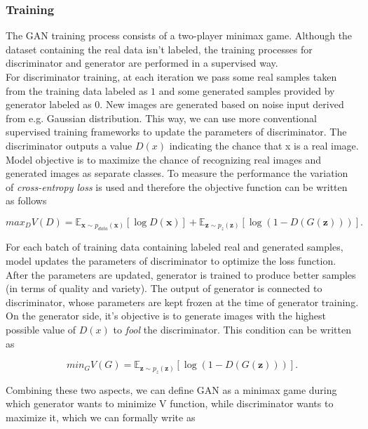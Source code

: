 \documentclass[12pt,a4paper,openany]{book}
\begin{document}
\subsubsection{Training}
\noindent The GAN training process consists of a two-player minimax game. Although the dataset containing the real data isn’t labeled, the training processes for discriminator and generator are performed in a supervised way.  \\
\noindent For discriminator training, at each iteration we pass some real samples taken from the training data labeled as $1$ and some generated samples provided by generator labeled as $0$. New images are generated based on noise input derived from e.g. Gaussian distribution. This way, we can use more conventional supervised training frameworks to update the parameters of discriminator. The discriminator outputs a value $D(x)$ indicating the chance that x is a real image. Model objective is to maximize the chance of recognizing real images and generated images as separate classes. To measure the performance the variation of \textit{cross-entropy loss} is used and therefore the objective function can be written as follows

\begin{equation}
max_{D} V(D) = \mathbb{E}_{\textbf{x} \sim p_{data}(\textbf{x})} [\log D(\textbf{x})] + \mathbb{E}_{\textbf{z} \sim p_{z}(\textbf{z})} [\log(1-D(G(\textbf{z})))].
\end{equation}

\noindent For each batch of training data containing labeled real and generated samples, model updates the parameters of discriminator to optimize the loss function. After the parameters are updated, generator is trained to produce better samples (in terms of quality and variety). The output of generator is connected to discriminator, whose parameters are kept frozen at the time of generator training. On the generator side, it's objective is to generate images with the highest possible value of $D(x)$ to \textit{fool} the discriminator. This condition can be written as

\begin{equation}
min_{G} V(G) = \mathbb{E}_{\textbf{z} \sim p_{z}(\textbf{z})} [\log(1-D(G(\textbf{z})))].
\end{equation}

\noindent Combining these two aspects, we can define GAN as a minimax game during which generator wants to minimize V function, while discriminator wants to maximize it, which we can formally write as
\end{document}
